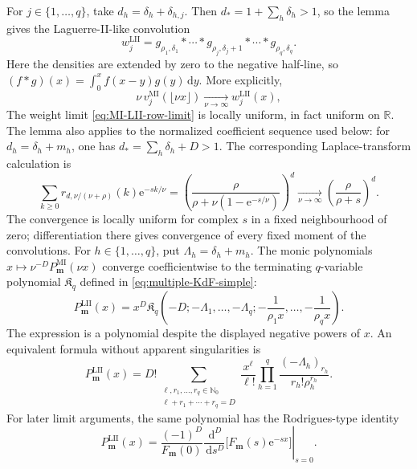 \documentclass[10pt]{amsart}
\newcommand{\Nzero}{\mathbb N_0}
\newcommand{\R}{\mathbb R}
\newcommand{\e}{\mathrm e}
\newcommand{\dd}{\,\mathrm d}
\newcommand{\mm}{\boldsymbol m}
\theoremstyle{plain}
\theoremstyle{definition}
\theoremstyle{remark}
\begin{document}
For \(j\in\{1,\ldots,q\}\), take
\(d_h=\delta_h+\delta_{h,j}\). Then
\(d_*=1+\sum_h\delta_h>1\), so the lemma gives the Laguerre-II-like
convolution
\begin{equation}
 w_j^{\mathrm{LII}}
 =g_{\rho_1,\delta_1}*\cdots *
 g_{\rho_j,\delta_j+1}*\cdots *
 g_{\rho_q,\delta_q}.
 \label{eq:LII-rows}
\end{equation}
Here the densities are extended by zero to the negative half-line, so
\((f*g)(x)=\int_0^xf(x-y)g(y)\dd y\).
More explicitly,
\begin{equation}
 \nu\,v_j^{\mathrm{MI}}(\lfloor\nu x\rfloor)
 \xrightarrow[\nu\to\infty]{}w_j^{\mathrm{LII}}(x),
 \label{eq:MI-LII-row-limit}
\end{equation}
The weight limit \eqref{eq:MI-LII-row-limit} is locally uniform, in fact
uniform on \(\R\). The lemma also applies to
the normalized coefficient sequence used below: for
\(d_h=\delta_h+m_h\), one has
\(d_*=\sum_h\delta_h+D>1\). The corresponding
Laplace-transform calculation is
\[
 \sum_{k\ge0}r_{d,\nu/(\nu+\rho)}(k)\e^{-sk/\nu}
 =\left(
 \frac{\rho}{\rho+\nu(1-\e^{-s/\nu})}
 \right)^d
 \xrightarrow[\nu\to\infty]{}\left(\frac{\rho}{\rho+s}\right)^d.
\]
The convergence is locally uniform for complex \(s\) in a fixed
neighbourhood of zero; differentiation there gives convergence of every
fixed moment of the convolutions.
For \(h\in\{1,\ldots,q\}\), put
\(\Lambda_h=\delta_h+m_h\). The monic polynomials
\(x\mapsto\nu^{-D}P_{\mm}^{\mathrm{MI}}(\nu x)\) converge
coefficientwise to the terminating \(q\)-variable polynomial
\(\mathfrak K_q\) defined in \eqref{eq:multiple-KdF-simple}:
\begin{equation}
 P_{\mm}^{\mathrm{LII}}(x)
 =x^D\mathfrak K_q
 \left(
 -D;-\Lambda_1,\ldots,-\Lambda_q;
 -\frac1{\rho_1x},\ldots,-\frac1{\rho_qx}
 \right).
 \label{eq:LII-A}
\end{equation}
The expression is a polynomial despite the displayed negative powers of
\(x\). An equivalent formula without apparent singularities is
\begin{equation}
 P_{\mm}^{\mathrm{LII}}(x)
 =D!\sum_{\substack{\ell,r_1,\ldots,r_q\in\Nzero\\
                     \ell+r_1+\cdots+r_q=D}}
 \frac{x^\ell}{\ell!}
 \prod_{h=1}^q
 \frac{(-\Lambda_h)_{r_h}}{r_h!\rho_h^{r_h}}.
 \label{eq:LII-A-finite-sum}
\end{equation}
For later limit arguments, the same polynomial has the Rodrigues-type
identity
\begin{equation}
 P_{\mm}^{\mathrm{LII}}(x)
 =\frac{(-1)^D}{F_{\mm}(0)}
 \left.\frac{\dd^D}{\dd s^D}
 \bigl[F_{\mm}(s)\e^{-sx}\bigr]\right|_{s=0}.
 \label{eq:LII-A-Rodrigues}
\end{equation}
\end{document}
